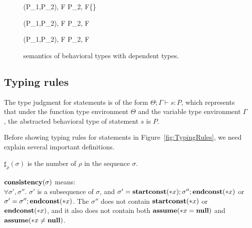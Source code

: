 \begin{figure}
\begin{minipage}{\textwidth}
{ \langle \Sirx (P_1,P_2), F \rangle \rightarrow \langle P_2, F\cup\{\snnull\} \rangle }

{ \langle \Sirx (P_1,P_2), F \rangle \rightarrow \langle P_2, F \rangle }

{ \langle \Sirx (P_1,P_2), F \rangle \rightarrow \langle P_2, F \rangle }

 



\end{minipage}
\caption{semantics of behavioral types with dependent types.}
\label{fig:bdRules}
\end{figure}

\subsection{Typing rules}
The type judgment for statements is of the form \(\Theta; \Gamma
\vdash s : P \), which represents that under the function type
environment \(\Theta\) and the variable type environment \(\Gamma\),
the abstracted behavioral type of statement \(s\) is \(P\).

Before showing typing rules for statements in Figure~\ref{fig:TypingRules}, we need explain several important definitions. 

\begin{myDef}[\(\sharp_{\rho}(\sigma)\)]
\label{df:sharf}
\(\sharp_{\rho}(\sigma)\) is the number of \(\rho\) in the sequence
\(\sigma\).
\end{myDef}

\begin{myDef}
\label{df:const}
\(\mathbf{consistency}(\sigma)\) means:\\
\( \forall \sigma',\sigma''\). \(\sigma'\) is a subsequence
of \(\sigma\), and \(\sigma' = \mathbf{startconst}(*x);\sigma'';\mathbf{endconst}(*x)\) or \(\sigma' = \sigma'';\mathbf{endconst}(*x)\). The \(\sigma''\) does not contain \(\mathbf{startconst}(*x)\) or \(\mathbf{endconst}(*x) \), and it also does not contain both \(\mathbf{assume}(*x = \mathbf{null})\) and \(\mathbf{assume}(*x \ne \mathbf{null})\).
\end{myDef}


